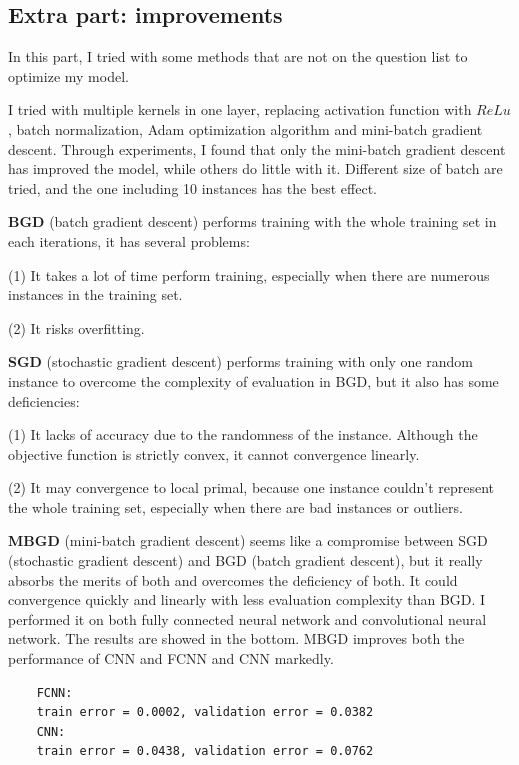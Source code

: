 \documentclass{article}
\begin{document}
\subsection{Extra part: improvements}
In this part, I tried with some methods that are not on the question list to optimize my model.\par
I tried with multiple kernels in one layer, replacing activation function with $ReLu$, batch normalization, Adam optimization algorithm and mini-batch gradient descent. Through experiments, I found that only the mini-batch gradient descent has improved the model, while others do little with it. Different size of batch are tried, and the one including 10 instances has the best effect.\par
\textbf{BGD} (batch gradient descent) performs training with the whole training set in each iterations, it has several problems:\par
(1) It takes a lot of time perform training, especially when there are numerous instances in the training set.\par
(2) It risks overfitting.\par
\textbf{SGD} (stochastic gradient descent) performs training with only one random instance to overcome the complexity of evaluation in BGD, but it also has some deficiencies:\par
(1) It lacks of accuracy due to the randomness of the instance. Although the objective function is strictly convex, it cannot convergence linearly.\par
(2) It may convergence to local primal, because one instance couldn't represent the whole training set, especially when there are bad instances or outliers.

\textbf{MBGD} (mini-batch gradient descent) seems like a compromise between SGD (stochastic gradient descent) and BGD (batch gradient descent), but it really absorbs the merits of both and overcomes the deficiency of both. It could convergence quickly and linearly with less evaluation complexity than BGD. I performed it on both fully connected neural network and convolutional neural network. The results are showed in the bottom. MBGD improves both the performance of CNN and FCNN and CNN markedly.

\begin{commandline}
	\begin{verbatim}
	FCNN:
	train error = 0.0002, validation error = 0.0382
	CNN:
	train error = 0.0438, validation error = 0.0762
	\end{verbatim}
\end{commandline}
\end{document}
